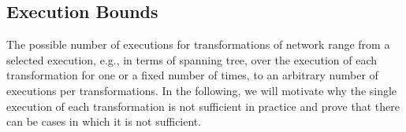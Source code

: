 


\subsection{Execution Bounds}

The possible number of executions for transformations of network range from a selected execution, e.g., in terms of spanning tree, over the execution of each transformation for one or a fixed number of times, to an arbitrary number of executions per transformations.
In the following, we will motivate why the single execution of each transformation is not sufficient in practice and prove that there can be cases in which it is not sufficient.

